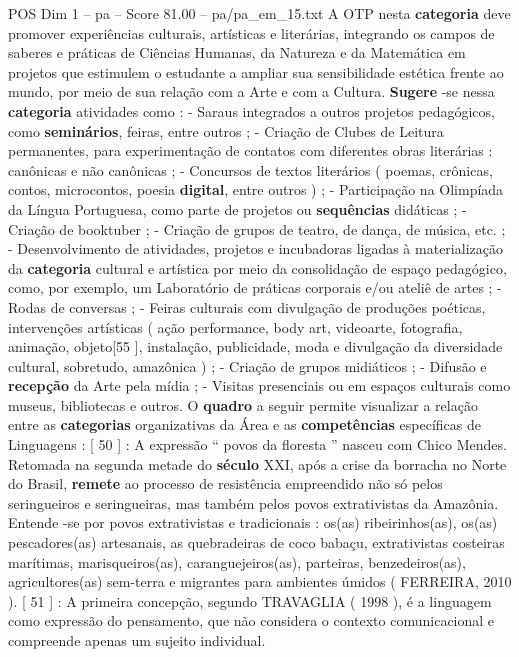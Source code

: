 \begin{textsample}{POS Dim 1 – pa – Score 81.00 – pa/pa\_em\_15.txt}
A OTP nesta \textbf{categoria} deve promover experiências culturais, artísticas e literárias, integrando os campos de saberes e práticas de Ciências Humanas, da Natureza e da Matemática em projetos que estimulem o estudante a ampliar sua sensibilidade estética frente ao mundo, por meio de sua relação com a Arte e com a Cultura. \textbf{Sugere} -se nessa \textbf{categoria} atividades como : - Saraus integrados a outros projetos pedagógicos, como \textbf{seminários}, feiras, entre outros ; - Criação de Clubes de Leitura permanentes, para experimentação de contatos com diferentes obras literárias : canônicas e não canônicas ; - Concursos de textos literários ( poemas, crônicas, contos, microcontos, poesia \textbf{digital}, entre outros ) ; - Participação na Olimpíada da Língua Portuguesa, como parte de projetos ou \textbf{sequências} didáticas ; - Criação de booktuber ; - Criação de grupos de teatro, de dança, de música, etc. ; - Desenvolvimento de atividades, projetos e incubadoras ligadas à materialização da \textbf{categoria} cultural e artística por meio da consolidação de espaço pedagógico, como, por exemplo, um Laboratório de práticas corporais e/ou ateliê de artes ; - Rodas de conversas ; - Feiras culturais com divulgação de produções poéticas, intervenções artísticas ( ação performance, body art, videoarte, fotografia, animação, objeto[55 ], instalação, publicidade, moda e divulgação da diversidade cultural, sobretudo, amazônica ) ; - Criação de grupos midiáticos ; - Difusão e \textbf{recepção} da Arte pela mídia ; - Visitas presenciais ou em espaços culturais como museus, bibliotecas e outros.
O \textbf{quadro} a seguir permite visualizar a relação entre as \textbf{categorias} organizativas da Área e as \textbf{competências} específicas de Linguagens : [ 50 ] : A expressão “ povos da floresta ” nasceu com Chico Mendes.
Retomada na segunda metade do \textbf{século} XXI, após a crise da borracha no Norte do Brasil, \textbf{remete} ao processo de resistência empreendido não só pelos seringueiros e seringueiras, mas também pelos povos extrativistas da Amazônia.
Entende -se por povos extrativistas e tradicionais : os(as) ribeirinhos(as), os(as) pescadores(as) artesanais, as quebradeiras de coco babaçu, extrativistas costeiras marítimas, marisqueiros(as), caranguejeiros(as), parteiras, benzedeiros(as), agricultores(as) sem-terra e migrantes para ambientes úmidos ( FERREIRA, 2010 ). [ 51 ] : A primeira concepção, segundo TRAVAGLIA ( 1998 ), é a linguagem como expressão do pensamento, que não considera o contexto comunicacional e compreende apenas um sujeito individual.

\end{textsample}
